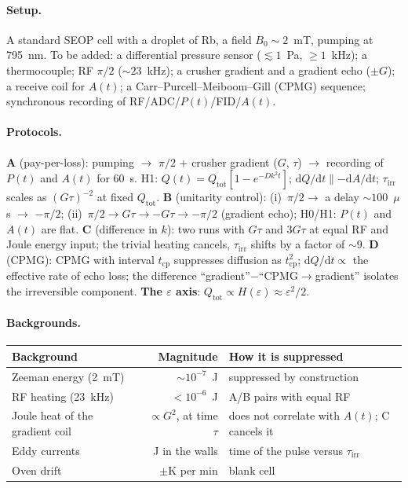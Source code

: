 \documentclass[11pt,a4paper]{article}
\begin{document}
\paragraph{Setup.}
A standard SEOP cell with a droplet of Rb, a field $B_0 \sim 2$~mT, pumping at 795~nm. To be added: a differential pressure sensor ($\lesssim 1$~Pa, $\ge 1$~kHz); a thermocouple; RF $\pi/2$ ($\sim 23$~kHz); a crusher gradient and a gradient echo ($\pm G$); a receive coil for $A(t)$; a Carr--Purcell--Meiboom--Gill (CPMG) sequence; synchronous recording of RF/ADC/$P(t)$/FID/$A(t)$.

\paragraph{Protocols.}
\textbf{A} (pay-per-loss): pumping $\to$ $\pi/2$ + crusher gradient ($G$, $\tau$) $\to$ recording of $P(t)$ and $A(t)$ for 60~s. H1: $Q(t)=Q_{\mathrm{tot}}[1-e^{-Dk^2 t}]$; $\mathrm{d} Q/\mathrm{d} t \parallel -\mathrm{d} A/\mathrm{d} t$; $\tau_{\mathrm{irr}}$ scales as $(G\tau)^{-2}$ at fixed $Q_{\mathrm{tot}}$. \textbf{B} (unitarity control): (i)~$\pi/2 \to$ a delay $\sim 100$~$\mu$s $\to$ $-\pi/2$; (ii)~$\pi/2 \to G\tau \to -G\tau \to -\pi/2$ (gradient echo); H0/H1: $P(t)$ and $A(t)$ are flat. \textbf{C} (difference in $k$): two runs with $G\tau$ and $3G\tau$ at equal RF and Joule energy input; the trivial heating cancels, $\tau_{\mathrm{irr}}$ shifts by a factor of $\sim 9$. \textbf{D} (CPMG): CPMG with interval $t_{\mathrm{cp}}$ suppresses diffusion as $t_{\mathrm{cp}}^2$; $\mathrm{d} Q/\mathrm{d} t \propto$ the effective rate of echo loss; the difference ``gradient''$-$``CPMG$\to$gradient'' isolates the irreversible component. \textbf{The $\varepsilon$ axis}: $Q_{\mathrm{tot}}\propto H(\varepsilon)\approx \varepsilon^2/2$.

\paragraph{Backgrounds.}\mbox{}\par
\noindent
{\small
\setlength{\tabcolsep}{4pt}
\begin{tabularx}{\textwidth}{|l|r|X|}
\hline
\textbf{Background} & \textbf{Magnitude} & \textbf{How it is suppressed} \\
\hline
Zeeman energy (2~mT) & $\sim 10^{-7}$~J & suppressed by construction \\
RF heating (23~kHz) & $< 10^{-6}$~J & A/B pairs with equal RF \\
Joule heat of the gradient coil & $\propto G^2$, at time $\tau$ & does not correlate with $A(t)$; C cancels it \\
Eddy currents & J in the walls & time of the pulse versus $\tau_{\mathrm{irr}}$ \\
Oven drift & $\pm$K per min & blank cell \\
\hline
\end{tabularx}
}
\end{document}
